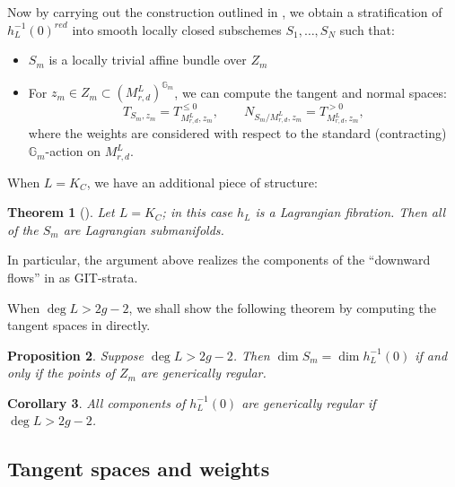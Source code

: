\documentclass{amsart}
\theoremstyle{plain}
\newtheorem{theorem}{Theorem}[section]
\newtheorem{proposition}[theorem]{Proposition}
\newtheorem{corollary}[theorem]{Corollary}
\theoremstyle{definition}
\theoremstyle{remark}
\begin{document}
Now by carrying out the construction outlined in \cite[\S2.1]{HL1}, we obtain a stratification of $h^{-1}_L(0)^{red}$ into smooth locally closed subschemes $S_1, \dots, S_N$ such that:
\begin{itemize}
    \item $S_m$ is a locally trivial affine bundle over $Z_m$
    \item\label{test} For $z_m\in Z_m\subset (M_{r,d}^L)^{\mathbb{G}_m}$, we can compute the tangent and normal spaces:
    \begin{equation}\label{eq:GITtangents}
        T_{S_m, z_m} = T_{M_{r,d}^L, z_m}^{\le 0}, \qquad N_{S_m/M_{r,d}^L, z_m} = T_{M_{r,d}^L, z_m}^{>0},
    \end{equation}
    where the weights are considered with respect to the standard (contracting) $\mathbb{G}_m$-action on $M_{r,d}^L$.
\end{itemize}

When $L = K_C$, we have an additional piece of structure:
\begin{theorem}[{\cite[Proposition 3.9]{HH}}]\label{prop:lagrangianstrata}
    Let $L = K_C$; in this case $h_L$ is a Lagrangian fibration.
    Then all of the $S_m$ are Lagrangian submanifolds.
\end{theorem}
In particular, the argument above realizes the components of the ``downward flows'' in \cite{HH} as GIT-strata. 

When $\deg L > 2g-2$, we shall show the following theorem by computing the tangent spaces in  directly.
\begin{proposition}\label{prop:twistedstrata}
    Suppose $\deg L > 2g-2$. Then $\dim S_m = \dim h_L^{-1}(0)$ if and only if the points of $Z_m$ are generically regular. 
\end{proposition}
\begin{corollary}
    All components of $h_L^{-1}(0)$ are generically regular if $\deg L>2g-2$.
\end{corollary}

\subsection{Tangent spaces and weights}\label{sec:tangents}
\end{document}
